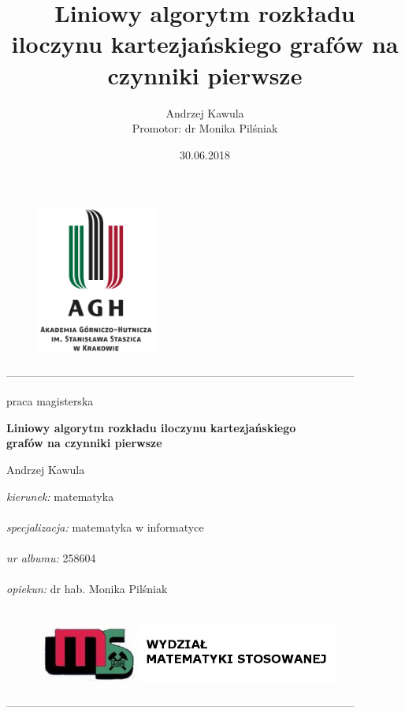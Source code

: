 \documentclass[12pt,a4paper,titlepage]{article}
\title{Liniowy algorytm rozkładu iloczynu kartezjańskiego grafów na czynniki pierwsze}
\date{30.06.2018}
\author{Andrzej Kawula \\ Promotor: dr Monika Pilśniak}
\begin{document}
\thispagestyle{empty}

\begin{figure}[t]
\centering
\includegraphics[width =4cm]{agh.png}
\end{figure}

\begin{center}
-----------------------------------------------------------------------------------------------
\end{center}
\begin{center}

\end{center}
\begin{center}
praca magisterska
\end{center}
\begin{center}
\textbf{Liniowy algorytm rozkładu iloczynu kartezjańskiego\\ grafów na czynniki pierwsze}
\end{center}
\begin{center}
Andrzej Kawula
\end{center}
\begin{flushleft}
\end{flushleft}
\textit{kierunek:} matematyka\\
\\
\textit{specjalizacja:} matematyka w informatyce \\
\\
\textit{nr albumu:} 258604 \\
\\
\textit{opiekun:} dr hab. Monika Pilśniak\\
\\
\begin{figure}[h]
\centering
\includegraphics[width = 10cm]{wms.png}
\end{figure}
\begin{center}
-----------------------------------------------------------------------------------------------
\end{center}
\end{document}
